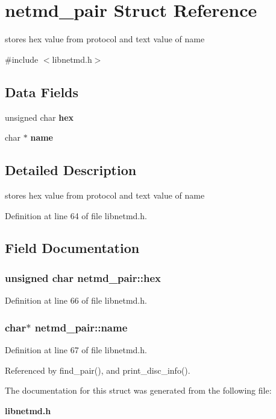 \section{netmd\_\-pair Struct Reference}
\label{structnetmd__pair}


stores hex value from protocol and text value of name  


{\ttfamily \#include $<$libnetmd.h$>$}\subsection*{Data Fields}
\begin{DoxyCompactItemize}
\item 
unsigned char {\bf hex}
\item 
char $\ast$ {\bf name}
\end{DoxyCompactItemize}


\subsection{Detailed Description}
stores hex value from protocol and text value of name 

Definition at line 64 of file libnetmd.h.

\subsection{Field Documentation}
\subsubsection[{hex}]{\setlength{\rightskip}{0pt plus 5cm}unsigned char {\bf netmd\_\-pair::hex}}\label{structnetmd__pair_ad22c6f0644c705385abb642de5871315}


Definition at line 66 of file libnetmd.h.
\subsubsection[{name}]{\setlength{\rightskip}{0pt plus 5cm}char$\ast$ {\bf netmd\_\-pair::name}}\label{structnetmd__pair_a746d20fabaee735698b639d2a4b26158}


Definition at line 67 of file libnetmd.h.

Referenced by find\_\-pair(), and print\_\-disc\_\-info().

The documentation for this struct was generated from the following file:\begin{DoxyCompactItemize}
\item 
{\bf libnetmd.h}\end{DoxyCompactItemize}
